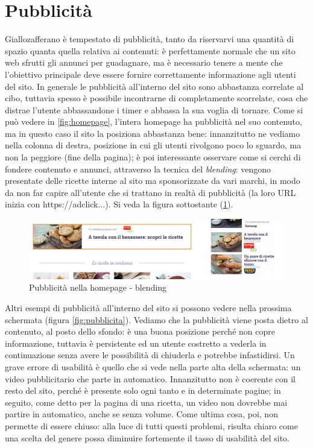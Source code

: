 \section{Pubblicità}
Giallozafferano è tempestato di pubblicità, tanto da riservarvi una quantità di spazio quanta quella relativa ai contenuti: è perfettamente normale che un sito web sfrutti gli annunci per guadagnare, ma è necessario tenere a mente che l'obiettivo principale deve essere fornire correttamente informazione agli utenti del sito.
In generale le pubblicità all'interno del sito sono abbastanza correlate al cibo, tuttavia spesso è possibile incontrarne di completamente scorrelate, cosa che distrae l'utente abbassandone i timer e abbassa la sua voglia di tornare.
Come si può vedere in \ref{fig:homepage}, l'intera homepage ha pubblicità nel suo contenuto, ma in questo caso il sito la posiziona abbastanza bene: innanzitutto ne vediamo nella colonna di destra, posizione in cui gli utenti rivolgono poco lo sguardo, ma non la peggiore (fine della pagina); è poi interessante osservare come si cerchi di fondere contenuto e annunci, attraverso la tecnica del \textit{blending}: vengono presentate delle ricette interne al sito ma sponsorizzate da vari marchi, in modo da non far capire all'utente che si trattano in realtà di pubblicità (la loro URL inizia con https://adclick...). Si veda la figura sottostante (\ref{fig:blending}).

\begin{figure}[h!]
	\centering
	\includegraphics[scale=0.2]{images/blending.png}
	\caption{Pubblicità nella homepage - blending}
	\label{fig:blending}
\end{figure}

Altri esempi di pubblicità all'interno del sito si possono vedere nella prossima schermata (figura \ref{fig:pubblicita}).
Vediamo che la pubblicità viene posta dietro al contenuto, al posto dello sfondo: è una buona posizione perché non copre informazione, tuttavia è persistente ed un utente costretto a vederla in continuazione senza avere le possibilità di chiuderla e potrebbe infastidirsi.
Un grave errore di usabilità è quello che si vede nella parte alta della schermata: un video pubblicitario che parte in automatico. Innanzitutto non è coerente con il resto del sito, perché è presente solo ogni tanto e in determinate pagine; in seguito, come detto per la pagina di una ricetta, un video non dovrebbe mai partire in automatico, anche se senza volume. Come ultima cosa, poi, non permette di essere chiuso: alla luce di tutti questi problemi, risulta chiaro come una scelta del genere possa diminuire fortemente il tasso di usabilità del sito.

